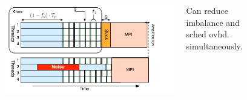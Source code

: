 \begin{frame}[label=hybridstatdyn]
\begin{columns}
\begin{figure}
\end{figure}
\begin{center}
\includegraphics[scale=0.31]{./images/threadedCompRegion-hybrid}
\end{center}
\vspace*{-0.3in}
\begin{center}
{\tiny Can reduce imbalance and sched ovhd. simultaneously.}
\end{center}
\end{columns}
\end{frame}


